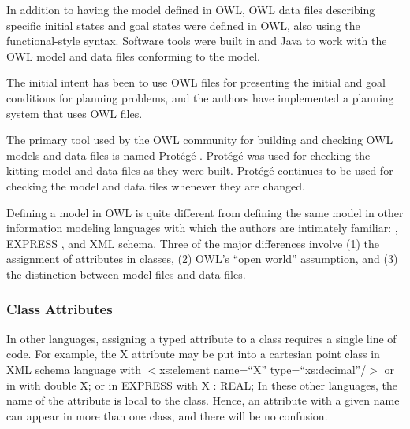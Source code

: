 In addition to having the model defined in OWL, OWL data files describing
specific initial states and goal states were defined in OWL, also using the
functional-style syntax.  Software tools were built in {\cpp} and Java to work with the
OWL model and data files conforming to the model.

The initial intent has been to use OWL files for presenting the initial and
goal conditions for planning problems, and the authors have implemented a
planning system that uses OWL files.

The primary tool used by the OWL community for building and checking OWL
models and data files is named Prot\'{e}g\'{e} \cite{Horridge.2011}.  Prot\'{e}g\'{e} was
used for checking the kitting model and data files as they were
built.  Prot\'{e}g\'{e} continues to be used for checking the model and data files
whenever they are changed.

Defining a model in OWL is quite different from defining the same model in
other information modeling languages with which the authors are intimately
familiar: {\cpp}, EXPRESS \cite{EXPRESSmanual}, and XML schema. Three of the
major differences involve (1) the assignment of attributes in classes, (2)
OWL's ``open world'' assumption, and (3) the distinction between model
files and data files.\\

\subsubsection{Class Attributes}
In other languages, assigning a typed attribute to a class requires a
single line of code. For example, the X attribute may be put into a
cartesian point class in XML schema language with
\newline \sf $<$xs:element name=``X'' type=``xs:decimal''/$>$\rm
\newline or in {\cpp} with
\newline \sf double X; \rm
\newline or in EXPRESS with
\newline \sf X : REAL; \rm \newline
In these other languages, the name of the attribute is local to the class.
Hence, an attribute with a given name can appear in more than one class, and
there will be no confusion.

